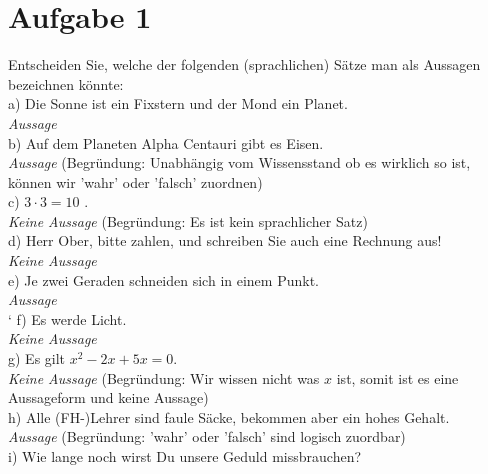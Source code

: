 \section*{Aufgabe 1}

Entscheiden Sie, welche der folgenden (sprachlichen) Sätze man als Aussagen bezeichnen könnte:\\

a) Die Sonne ist ein Fixstern und der Mond ein Planet.\\

\textit{Aussage}\\

b) Auf dem Planeten Alpha Centauri gibt es Eisen.\\

\textit{Aussage} (Begründung: Unabhängig vom Wissensstand ob es wirklich so ist, können wir 'wahr' oder 'falsch' zuordnen)\\

c) $3 \cdot 3 = 10$ .\\

\textit{Keine Aussage} (Begründung: Es ist kein sprachlicher Satz)\\

d) Herr Ober, bitte zahlen, und schreiben Sie auch eine Rechnung aus!\\

\textit{Keine Aussage}\\

e) Je zwei Geraden schneiden sich in einem Punkt.\\

\textit{Aussage}\\
`
f) Es werde Licht.\\

\textit{Keine Aussage}\\

g) Es gilt $x^2 - 2x + 5x = 0$.\\

\textit{Keine Aussage} (Begründung: Wir wissen nicht was $x$ ist, somit ist es eine Aussageform und keine Aussage)\\

h) Alle (FH-)Lehrer sind faule Säcke, bekommen aber ein hohes Gehalt.\\

\textit{Aussage} (Begründung: 'wahr' oder 'falsch' sind logisch zuordbar)\\

i) Wie lange noch wirst Du unsere Geduld missbrauchen?\\

